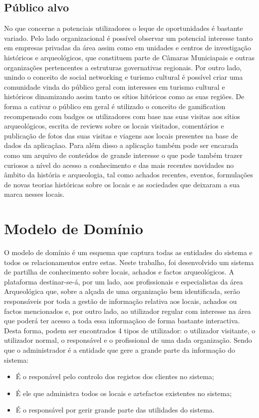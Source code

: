 ﻿\documentclass[12pt,a4paper]{article}
\begin{document}
\subsection{Público alvo}
No que concerne a potenciais utilizadores o leque de oportunidades é bastante variado.
Pelo lado organizacional é possível observar um potencial interesse tanto em empresas privadas
da área assim como em unidades e centros de investigação históricos e arqueológicos, que
constituem parte de Câmaras Municiapais e outras organizações pertencentes a estruturas
governativas regionais. Por outro lado, unindo o conceito de social networking e turismo
cultural é possível criar uma comunidade vinda do público geral com interesses em turismo
cultural e históricos dinamizando assim tanto os sítios hitóricos como as suas regiões. De
forma a cativar o público em geral é utilizado o conceito de gamification recompensado com
badges os utilizadores com base nas suas visitas aos sítios arqueológicos, escrita de reviews
sobre os locais visitados, comentários e publicação de fotos das suas visitas e viagens aos
locais presentes na base de dados da aplicaçãao. Para além disso a aplicação também pode
ser encarada como um arquivo de conteúdos de grande interesse o que pode também trazer
curiosos a nível do acesso a conhecimento e das mais recentes novidades no âmbito da história
e arqueologia, tal como achados recentes, eventos, formulações de novas teorias históricas
sobre os locais e as sociedades que deixaram a sua marca nesses locais.

\clearpage

\section{Modelo de Domínio}
O modelo de domínio é um esquema que captura todas as entidades do sistema e todos os relacionamentos entre estas. Neste trabalho, foi desenvolvido um sistema de partilha de conhecimento sobre locais, achados e factos arqueológicos. A plataforma destinar-se-á, por um lado, aos profissionais e especialistas da área Arqueológica que, sobre a alçada de uma organização bem identificada, serão responsáveis por toda a gestão de informação relativa aos locais, achados ou factos mencionados e, por outro lado, ao utilizador regular com interesse na área que poderá ter acesso a toda essa informaçãoo de forma bastante interactiva. Desta forma, podem ser encontrados 4 tipos de utilizador: o utilizador visitante, o utilizador normal, o responsável e o profissional de uma dada organização. Sendo que o administrador é a entidade que gere a grande parte da informação do sistema:\\
\begin{itemize}
\item É o responável pelo controlo dos registos dos clientes no sistema;
\item É ele que administra todos os locais e artefactos existentes no sistema;
\item É o responsável por gerir grande parte das utilidades do sistema.
\end{itemize}
\end{document}

